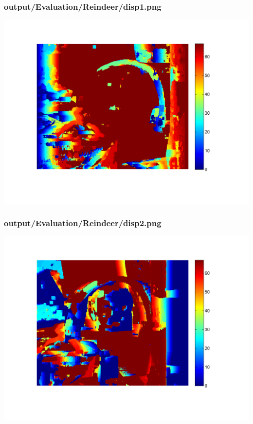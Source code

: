 \subsubsection{output/Evaluation/Reindeer/disp1.png}
    \includegraphics[scale=0.5]{output/Evaluation/Reindeer/disp1.png}

\subsubsection{output/Evaluation/Reindeer/disp2.png}
    \includegraphics[scale=0.5]{output/Evaluation/Reindeer/disp2.png}

